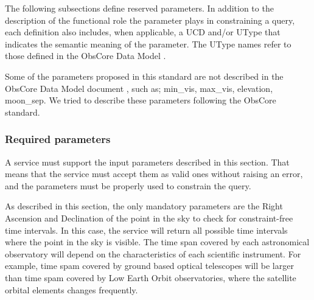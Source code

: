 \documentclass[11pt,a4paper]{ivoatex/ivoa}
\begin{document}
The following subsections define reserved parameters. In addition to the
description of the functional role the parameter plays in constraining a
query, each definition also includes, when applicable, a UCD and/or
UType that indicates the semantic meaning of the parameter. The UType
names refer to those defined in the ObsCore Data Model .

Some of the parameters proposed in this standard are not described in
the ObsCore Data Model document , such as; min\_vis, max\_vis,
elevation, moon\_sep. We tried to describe these parameters following
the ObsCore standard.

\subsubsection{Required parameters}
A service must support the input parameters described in this section.
That means that the service must accept them as valid ones without
raising an error, and the parameters must be properly used to constrain
the query.

As described in this section, the only mandatory parameters are the
Right Ascension and Declination of the point in the sky to check for
constraint-free time intervals. In this case, the service will return
all possible time intervals where the point in the sky is visible. The
time span covered by each astronomical observatory will depend on the
characteristics of each scientific instrument. For example, time spam
covered by ground based optical telescopes will be larger than time spam
covered by Low Earth Orbit observatories, where the satellite orbital
elements changes frequently.
\end{document}
